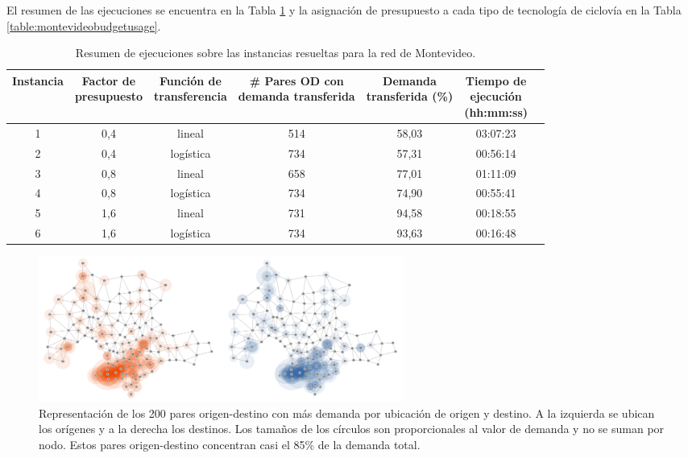 El resumen de las ejecuciones se encuentra en la Tabla \ref{table:montevideoexecutions} y la asignación de presupuesto a cada tipo de tecnología de ciclovía en la Tabla \ref{table:montevideobudgetusage}.

\begin{table}[h!]
  \centering
  \begin{adjustbox}{width=1.2\textwidth,center=\textwidth}
    \begin{tabular}{ccccccc}
      \toprule
        Instancia & \shortstack{Factor de \\ presupuesto} & \shortstack{Función de \\ transferencia} & \shortstack{\# Pares OD con \\ demanda transferida} & \shortstack{Demanda \\ transferida (\%)} & \shortstack{Tiempo de \\ ejecución \\ (hh:mm:ss)} \\
      \midrule
        1 & 0,4 & lineal    & 514 & 58,03 & 03:07:23 \\
        2 & 0,4 & logística & 734 & 57,31 &  00:56:14 \\
        3 & 0,8 & lineal    & 658 & 77,01 &  01:11:09 \\
        4 & 0,8 & logística & 734 & 74,90 &  00:55:41 \\
        5 & 1,6 & lineal    & 731 & 94,58 &  00:18:55 \\
        6 & 1,6 & logística & 734 & 93,63 &  00:16:48 \\
      \bottomrule
    \end{tabular}
  \end{adjustbox}
  \caption{Resumen de ejecuciones sobre las instancias resueltas para la red de Montevideo.}\label{table:montevideoexecutions}
\end{table}

\begin{figure}[h!]
  \centering
  \includegraphics[width=12cm]{../resources/montevideo_demands.png}
    \caption{Representación de los 200 pares origen-destino con más demanda por ubicación de origen y destino. A la izquierda se ubican los orígenes y a la derecha los destinos. Los tamaños de los círculos son proporcionales al valor de demanda y no se suman por nodo. Estos pares origen-destino concentran casi el 85\% de la demanda total.}
  \label{fig:montevideodemanddist}
\end{figure}

